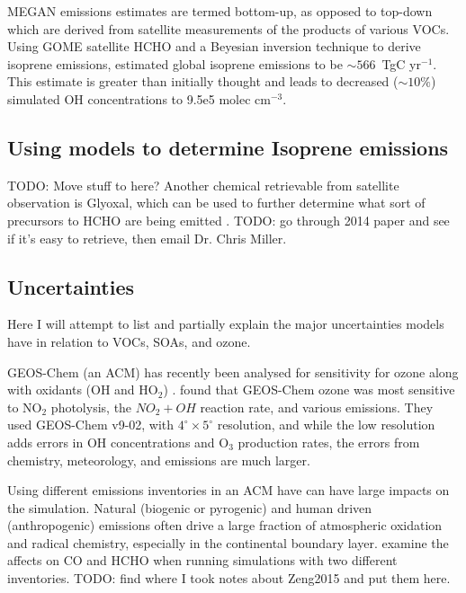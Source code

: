    MEGAN emissions estimates are termed bottom-up, as opposed to top-down which are derived from satellite measurements of the products of various VOCs.
    Using GOME satellite HCHO and a Beyesian inversion technique to derive isoprene emissions, \citet{Shim2005} estimated global isoprene emissions to be $\sim566$~TgC yr$^{-1}$. 
    This estimate is greater than initially thought and leads to decreased ($\sim10\%$) simulated OH concentrations to 9.5e5 molec cm$^{-3}$.
    
  \subsection{Using models to determine Isoprene emissions}
    TODO: Move stuff to here?
    Another chemical retrievable from satellite observation is Glyoxal, which can be used to further determine what sort of precursors to HCHO are being emitted \citep{Miller2014, Miller2017}.
    TODO: go through 2014 paper and see if it's easy to retrieve, then email Dr. Chris Miller.
  
  \subsection{Uncertainties}
    Here I will attempt to list and partially explain the major uncertainties models have in relation to  VOCs, SOAs, and ozone. 
    
    GEOS-Chem (an ACM) has recently been analysed for sensitivity for ozone along with oxidants (OH and HO$_2$) \citep{Christian2017}.
    \cite{Christian2017} found that GEOS-Chem ozone was most sensitive to NO$_2$ photolysis, the $NO_2 + OH$ reaction rate, and various emissions.
    They used GEOS-Chem v9-02, with $4^{\circ} \times 5^{\circ}$ resolution, and while the low resolution adds errors in OH concentrations and O$_3$ production rates, the errors from chemistry, meteorology, and emissions are much larger.
    
    Using different emissions inventories in an ACM have can have large impacts on the simulation.
    Natural (biogenic or pyrogenic) and human driven (anthropogenic) emissions often drive a large fraction of atmospheric oxidation and radical chemistry, especially in the continental boundary layer.
    \cite{Zeng2015} examine the affects on CO and HCHO when running simulations with two different inventories.
    TODO: find where I took notes about Zeng2015 and put them here.
    
